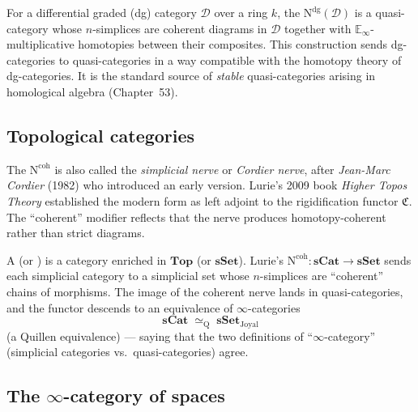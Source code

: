 \begin{remark}
\label{rem:dg-nerve}
For a differential graded (dg) category $\mathcal{D}$ over a ring $k$, the
 $\mathrm{N}^{\mathrm{dg}}(\mathcal{D})$ is a quasi-category
whose $n$-simplices are coherent diagrams in $\mathcal{D}$ together with
$\mathbb{E}_\infty$-multiplicative homotopies between their composites.
This construction sends dg-categories to quasi-categories in a way
compatible with the homotopy theory of dg-categories. It is the standard
source of \emph{stable} quasi-categories arising in homological algebra
(Chapter~53).
\end{remark}

\subsection{Topological categories}

\begin{nameorigin}
The  $\mathrm{N}^{\mathrm{coh}}$ is also called the
\emph{simplicial nerve} or \emph{Cordier nerve}, after \emph{Jean-Marc
Cordier} (1982) who introduced an early version. Lurie's 2009 book
\emph{Higher Topos Theory} established the modern form as left adjoint to
the rigidification functor $\mathfrak{C}$. The ``coherent'' modifier
reflects that the nerve produces homotopy-coherent rather than strict
diagrams.
\end{nameorigin}

\begin{remark}
\label{rem:coherent-nerve}
A  (or ) is a
category enriched in $\mathbf{Top}$ (or $\mathbf{sSet}$). Lurie's
$\mathrm{N}^{\mathrm{coh}} : \mathbf{sCat} \to \mathbf{sSet}$ sends each
simplicial category to a simplicial set whose $n$-simplices are
``coherent'' chains of morphisms. The image of the coherent nerve lands
in quasi-categories, and the functor descends to an equivalence of
$\infty$-categories
\begin{equation*}
  \mathbf{sCat} \;\simeq_{\mathrm{Q}}\; \mathbf{sSet}_{\mathrm{Joyal}}
\end{equation*}
(a Quillen equivalence) — saying that the two definitions of
``$\infty$-category'' (simplicial categories vs.\ quasi-categories)
agree.
\end{remark}

\subsection{The $\infty$-category of spaces}

